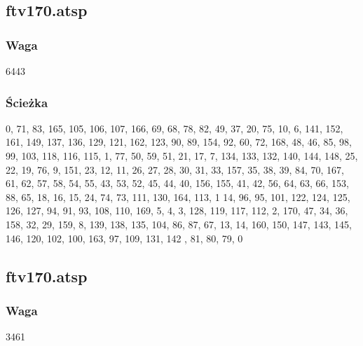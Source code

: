 \documentclass{article}
\begin{document}
\subsection{ftv170.atsp}

\subsubsection{Waga}
6443
\subsubsection{Ścieżka}
0, 71, 83, 165, 105, 106, 107, 166, 69, 68, 78, 82, 49, 37, 20, 75, 10, 6, 141, 152, 161, 149, 137, 136, 129, 121, 162, 123, 90, 89, 154, 92, 60, 72, 168, 48, 46, 85, 98, 99, 103, 118, 116, 115, 1, 77, 50, 59, 51, 21, 17, 7, 134, 133, 132,
 140, 144, 148, 25, 22, 19, 76, 9, 151, 23, 12, 11, 26, 27, 28, 30, 31, 33, 157, 35, 38, 39, 84, 70, 167, 61, 62, 57, 58, 54, 55, 43, 53, 52, 45, 44, 40, 156, 155, 41, 42, 56, 64, 63, 66, 153, 88, 65, 18, 16, 15, 24, 74, 73, 111, 130, 164, 113, 1
14, 96, 95, 101, 122, 124, 125, 126, 127, 94, 91, 93, 108, 110, 169, 5, 4, 3, 128, 119, 117, 112, 2, 170, 47, 34, 36, 158, 32, 29, 159, 8, 139, 138, 135, 104, 86, 87, 67, 13, 14, 160, 150, 147, 143, 145, 146, 120, 102, 100, 163, 97, 109, 131, 142
, 81, 80, 79, 0
\subsection{ftv170.atsp}
\subsubsection{Waga}
3461
\end{document}
